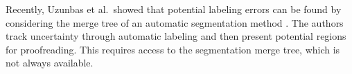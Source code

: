 Recently, Uzunbas et al.\ showed that potential labeling errors can be found by considering the merge tree of an automatic segmentation method \cite{uzunbas}. The authors track uncertainty through automatic labeling and then present potential regions for proofreading. This requires access to the segmentation merge tree, which is not always available.



